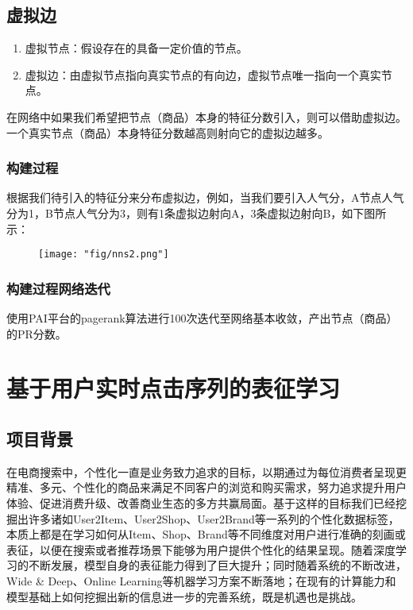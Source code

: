 \subsection{虚拟边}
\begin{enumerate}
\item 虚拟节点：假设存在的具备一定价值的节点。
\item 虚拟边：由虚拟节点指向真实节点的有向边，虚拟节点唯一指向一个真实节点。
\end{enumerate}
在网络中如果我们希望把节点（商品）本身的特征分数引入，则可以借助虚拟边。一个真实节点（商品）本身特征分数越高则射向它的虚拟边越多。

\subsubsection{构建过程}
根据我们待引入的特征分来分布虚拟边，例如，当我们要引入人气分，A节点人气分为1，B节点人气分为3，则有1条虚拟边射向A，3条虚拟边射向B，如下图所示：
\begin{figure}[!h]
	\centering
	\texttt{[image: "fig/nns2.png"]}
	\caption{}
	\label{fig:nns2}
\end{figure}

\subsubsection{构建过程网络迭代}
使用PAI平台的pagerank算法进行100次迭代至网络基本收敛，产出节点（商品）的PR分数。


\section{基于用户实时点击序列的表征学习}

\subsection{项目背景}

在电商搜索中，个性化一直是业务致力追求的目标，以期通过为每位消费者呈现更精准、多元、个性化的商品来满足不同客户的浏览和购买需求，努力追求提升用户体验、促进消费升级、改善商业生态的多方共赢局面。基于这样的目标我们已经挖掘出许多诸如User2Item、User2Shop、User2Brand等一系列的个性化数据标签，本质上都是在学习如何从Item、Shop、Brand等不同维度对用户进行准确的刻画或表征，以便在搜索或者推荐场景下能够为用户提供个性化的结果呈现。随着深度学习的不断发展，模型自身的表征能力得到了巨大提升；同时随着系统的不断改进，Wide \& Deep、Online Learning等机器学习方案不断落地；在现有的计算能力和模型基础上如何挖掘出新的信息进一步的完善系统，既是机遇也是挑战。

